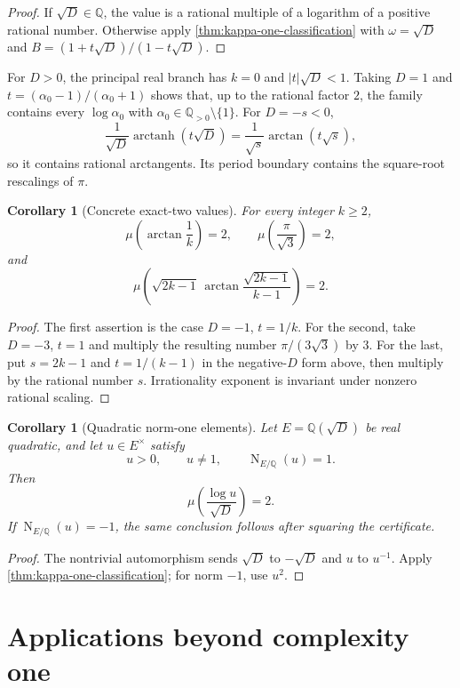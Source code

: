 \documentclass[11pt]{article}
\newcommand{\QQ}{\mathbb Q}
\DeclareMathOperator{\Nm}{N}
\DeclareMathOperator{\arctanh}{arctanh}
\newtheorem{corollary}[theorem]{Corollary}
\theoremstyle{definition}
\theoremstyle{remark}
\numberwithin{equation}{section}
\begin{document}
\begin{proof}
If $\sqrt D\in\QQ$, the value is a rational multiple of a logarithm of
a positive rational number.  Otherwise apply
\cref{thm:kappa-one-classification} with
$\omega=\sqrt D$ and
$B=(1+t\sqrt D)/(1-t\sqrt D)$.
\end{proof}

For $D>0$, the principal real branch has $k=0$ and
$|t|\sqrt D<1$.  Taking $D=1$ and
$t=(\alpha_0-1)/(\alpha_0+1)$ shows that, up to the rational factor $2$, the
family contains every $\log\alpha_0$ with
$\alpha_0\in\QQ_{>0}\setminus\{1\}$.  For $D=-s<0$,
\[
 \frac1{\sqrt D}\arctanh(t\sqrt D)
 =\frac1{\sqrt s}\arctan(t\sqrt s),
\]
so it contains rational arctangents.  Its period boundary contains the
square-root rescalings of $\pi$.

\begin{corollary}[Concrete exact-two values]\label{cor:concrete-values}
For every integer $k\ge2$,
\[
 \mu\!\left(\arctan\frac1k\right)=2,
 \qquad
 \mu\!\left(\frac\pi{\sqrt3}\right)=2,
\]
and
\[
 \boxed{
 \mu\!\left(
  \sqrt{2k-1}\,
  \arctan\frac{\sqrt{2k-1}}{k-1}
 \right)=2.}
\]
\end{corollary}

\begin{proof}
The first assertion is the case $D=-1$, $t=1/k$.  For the second, take
$D=-3$, $t=1$ and multiply the resulting number
$\pi/(3\sqrt3)$ by $3$.  For the last, put
$s=2k-1$ and $t=1/(k-1)$ in the negative-$D$ form above, then multiply
by the rational number $s$.  Irrationality exponent is invariant under
nonzero rational scaling.
\end{proof}

\begin{corollary}[Quadratic norm-one elements]
\label{cor:quadratic-norm-one}
Let $E=\QQ(\sqrt D)$ be real quadratic, and let
$u\in E^\times$ satisfy
\[
 u>0,
 \qquad u\ne1,
 \qquad \Nm_{E/\QQ}(u)=1.
\]
Then
\[
 \boxed{
 \mu\left(\frac{\log u}{\sqrt D}\right)=2.}
\]
If $\Nm_{E/\QQ}(u)=-1$, the same conclusion follows after squaring the
certificate.
\end{corollary}

\begin{proof}
The nontrivial automorphism sends $\sqrt D$ to $-\sqrt D$ and $u$ to
$u^{-1}$.  Apply \cref{thm:kappa-one-classification}; for norm $-1$,
use $u^2$.
\end{proof}

\section{Applications beyond complexity one}\label{sec:applications}
\end{document}
